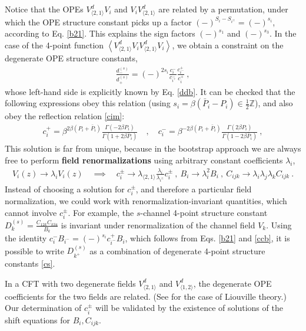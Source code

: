\documentclass[12pt, a4paper]{article}
\newcommand{\myindex}[1]{\textbf{\boldmath #1}}
\theoremstyle{break}
\begin{document}
Notice that the OPEs $V^d_{\langle 2,1\rangle}V_i$ and $V_iV^d_{\langle 2,1\rangle}$ are related by a permutation, under which the OPE structure constant picks up a factor $(-)^{S_i-S_{i^\pm}} = (-)^{s_i}$, according to Eq. \eqref{b21}. This explains the sign factors $(-)^{s_1}$ and $(-)^{s_3}$. In the case of the 4-point function $\left<V_{\langle 2,1\rangle}^d V_iV_{\langle 2,1\rangle}^d V_i\right>$, we obtain a constraint on the degenerate OPE structure constants,
\begin{align}
 \frac{d^{(s)}_-}{d^{(s)}_+}= (-)^{2s_i}\frac{c_i^-}{c_{i^+}^-} \frac{c_{i^-}^+}{c_i^+}\ ,  
 \label{ddcccc}
\end{align}
whose left-hand side is explicitly known by Eq. \eqref{ddb}. It can be checked that the following expressions obey this relation (using $s_i=\beta(\bar P_i-P_i) \in \frac12\mathbb{Z}$), and also obey the reflection relation \eqref{cim}: 
\begin{align}
 c^+_i = \beta^{2\beta(P_i+\bar P_i)} \frac{\Gamma(-2\beta P_i)}{\Gamma(1+2\beta \bar P_i)} \quad , \quad c^-_i = \beta^{-2\beta(P_i+\bar P_i)} \frac{\Gamma(2\beta P_i)}{\Gamma(1-2\beta \bar P_i)}\ ,
 \label{cpcm}
\end{align}
This solution is far from unique, because in the bootstrap approach we are always free to perform \myindex{field renormalizations} using arbitrary constant coefficients $\lambda_i$,
\begin{align}
 V_i(z) \to \lambda_i V_i(z)\quad \implies \quad c_i^\pm \to \lambda_{\langle 2,1\rangle}\frac{\lambda_i}{\lambda_{i^\pm}}c_i^\pm \ , \  B_i \to \lambda_i^2B_i \ , \ C_{ijk}\to \lambda_i\lambda_j\lambda_k C_{ijk}\ .
 \label{vlv}
\end{align}
Instead of choosing a solution for $c_i^\pm$, and therefore a particular field normalization, 
we could work with renormalization-invariant quantities, which cannot involve $c_i^\pm$. For example, the $s$-channel 4-point structure constant $D^{(s)}_k = \frac{C_{12k}C_{k34}}{B_k}$ is invariant under renormalization of the channel field $V_k$. Using the identity $c_i^- B_{i^-} = (-)^{s_i} c^+_{i^-} B_i$, which follows from Eqs. \eqref{b21} and \eqref{ccb}, it is possible to write $D^{(s)}_{k^+}$ as a combination of degenerate 4-point structure constants \eqref{cs}. 

In a CFT with two degenerate fields $V^d_{\langle 2,1\rangle}$ and $V^d_{\langle 1,2\rangle}$, the degenerate OPE coefficients for the two fields are related. (See \cite[Exercise 3.2]{rib14} for the case of Liouville theory.) Our determination of $c_i^\pm$ will be validated by the existence of solutions of the shift equations for $B_i,C_{ijk}$. 
\end{document}
